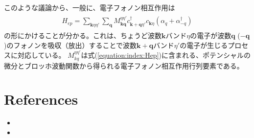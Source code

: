 \documentclass[letterpaper,10pt,dvipdfmx]{sphinxhowto}
\begin{document}
このような議論から、一般に、電子フォノン相互作用は
\begin{equation*}
\begin{split}\begin{aligned}
H_{ep} =
\sum_{\mathbf{k}\eta\eta'}{\sum_{\mathbf{q}}^{}M_{\mathbf{kq}}^{\eta\eta'}}c_{\mathbf{k
+ q}\eta'}^{\dagger}c_{\mathbf{k}\eta}\left(\alpha_q+ \alpha_{-q}^{\dagger} \right)\end{aligned}\end{split}
\end{equation*}
の形にかけることが分かる。これは、ちょうど波数\(\mathbf{k}\)バンド\(\eta\)の電子が波数\(\mathbf{q}\)
(\(- \mathbf{q}\))のフォノンを吸収（放出）することで波数\(\mathbf{k + q}\)バンド\(\eta'\)の電子が生じるプロセスに対応している。
\(M_{kq}^{\eta\eta'}\)は式(\eqref{equation:index:Hep})に含まれる、ポテンシャルの微分とブロッホ波動関数から得られる電子フォノン相互作用行列要素である。


\chapter{References}
\label{\detokenize{index:references}}\begin{itemize}
\item {} 

\item {} 

\end{itemize}



\renewcommand{\indexname}{索引}
\printindex
\end{document}
